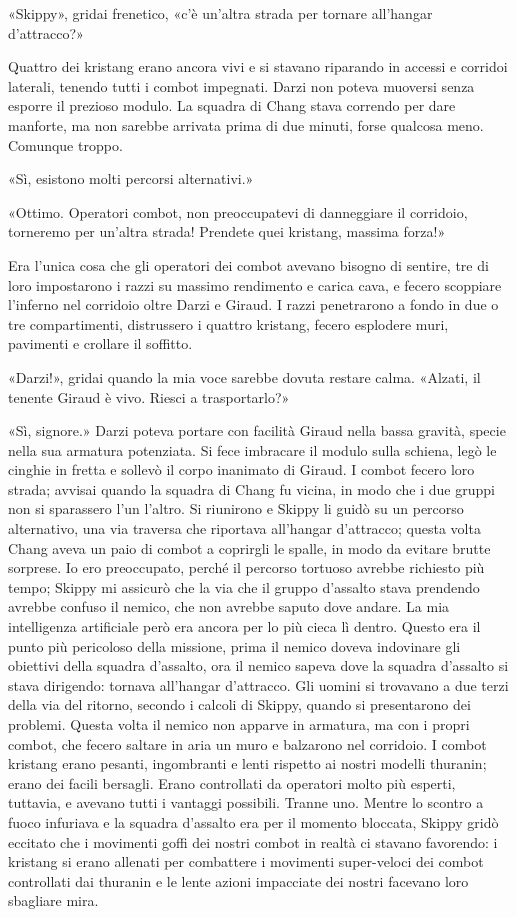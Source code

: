 «Skippy», gridai frenetico, «c'è un'altra strada per tornare all'hangar
d'attracco?»

Quattro dei kristang erano ancora vivi e si stavano riparando in accessi
e corridoi laterali, tenendo tutti i combot impegnati. Darzi non poteva
muoversi senza esporre il prezioso modulo. La squadra di Chang stava
correndo per dare manforte, ma non sarebbe arrivata prima di due minuti,
forse qualcosa meno. Comunque troppo.

«Sì, esistono molti percorsi alternativi.»

«Ottimo. Operatori combot, non preoccupatevi di danneggiare il
corridoio, torneremo per un'altra strada! Prendete quei kristang,
massima forza!»

Era l'unica cosa che gli operatori dei combot avevano bisogno di
sentire, tre di loro impostarono i razzi su massimo rendimento e carica
cava, e fecero scoppiare l'inferno nel corridoio oltre Darzi e Giraud. I
razzi penetrarono a fondo in due o tre compartimenti, distrussero i
quattro kristang, fecero esplodere muri, pavimenti e crollare il
soffitto.

«Darzi!», gridai quando la mia voce sarebbe dovuta restare calma.
«Alzati, il tenente Giraud è vivo. Riesci a trasportarlo?»

«Sì, signore.» Darzi poteva portare con facilità Giraud nella bassa
gravità, specie nella sua armatura potenziata. Si fece imbracare il
modulo sulla schiena, legò le cinghie in fretta e sollevò il corpo
inanimato di Giraud. I combot fecero loro strada; avvisai quando la
squadra di Chang fu vicina, in modo che i due gruppi non si sparassero
l'un l'altro. Si riunirono e Skippy li guidò su un percorso alternativo,
una via traversa che riportava all'hangar d'attracco; questa volta Chang
aveva un paio di combot a coprirgli le spalle, in modo da evitare brutte
sorprese. Io ero preoccupato, perché il percorso tortuoso avrebbe
richiesto più tempo; Skippy mi assicurò che la via che il gruppo
d'assalto stava prendendo avrebbe confuso il nemico, che non avrebbe
saputo dove andare. La mia intelligenza artificiale però era ancora per
lo più cieca lì dentro. Questo era il punto più pericoloso della
missione, prima il nemico doveva indovinare gli obiettivi della squadra
d'assalto, ora il nemico sapeva dove la squadra d'assalto si stava
dirigendo: tornava all'hangar d'attracco. Gli uomini si trovavano a due
terzi della via del ritorno, secondo i calcoli di Skippy, quando si
presentarono dei problemi. Questa volta il nemico non apparve in
armatura, ma con i propri combot, che fecero saltare in aria un muro e
balzarono nel corridoio. I combot kristang erano pesanti, ingombranti e
lenti rispetto ai nostri modelli thuranin; erano dei facili bersagli.
Erano controllati da operatori molto più esperti, tuttavia, e avevano
tutti i vantaggi possibili. Tranne uno. Mentre lo scontro a fuoco
infuriava e la squadra d'assalto era per il momento bloccata, Skippy
gridò eccitato che i movimenti goffi dei nostri combot in realtà ci
stavano favorendo: i kristang si erano allenati per combattere i
movimenti super-veloci dei combot controllati dai thuranin e le lente
azioni impacciate dei nostri facevano loro sbagliare mira.

